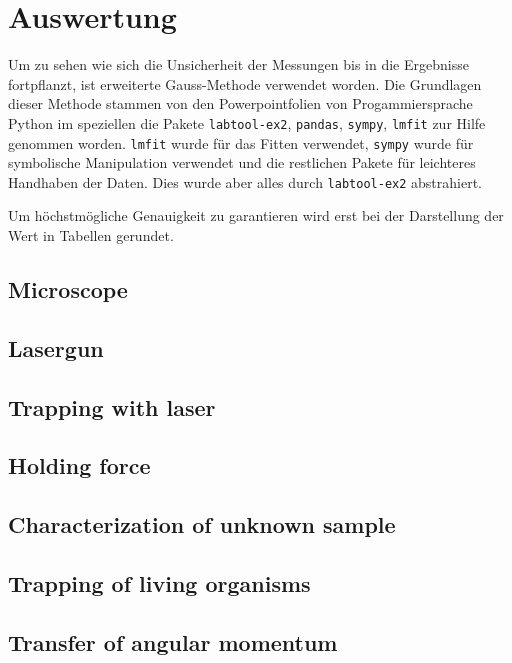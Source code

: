 \documentclass[12pt,english,ngerman]{scrartcl}
\begin{document}
\section{Auswertung}\label{sec:auswertung}

Um zu sehen wie sich die Unsicherheit der Messungen bis in die Ergebnisse
fortpflanzt, ist erweiterte Gauss-Methode verwendet worden. Die Grundlagen
dieser Methode stammen von den Powerpointfolien von
Progammiersprache Python im speziellen die Pakete \verb#labtool-ex2#,
\verb#pandas#, \verb#sympy#, \verb#lmfit# zur Hilfe genommen worden.
\verb#lmfit# wurde für das Fitten verwendet, \verb#sympy# wurde für symbolische
Manipulation verwendet und die restlichen Pakete für leichteres Handhaben der
Daten. Dies wurde aber alles durch \verb#labtool-ex2# abstrahiert.

Um höchstmögliche Genauigkeit zu garantieren wird erst bei der Darstellung der
Wert in Tabellen gerundet.


\subsection{Microscope}

\subsection{Lasergun}


\subsection{Trapping with laser}


\subsection{Holding force}


\subsection{Characterization of unknown sample}


\subsection{Trapping of living organisms}


\subsection{Transfer of angular momentum}
\end{document}
